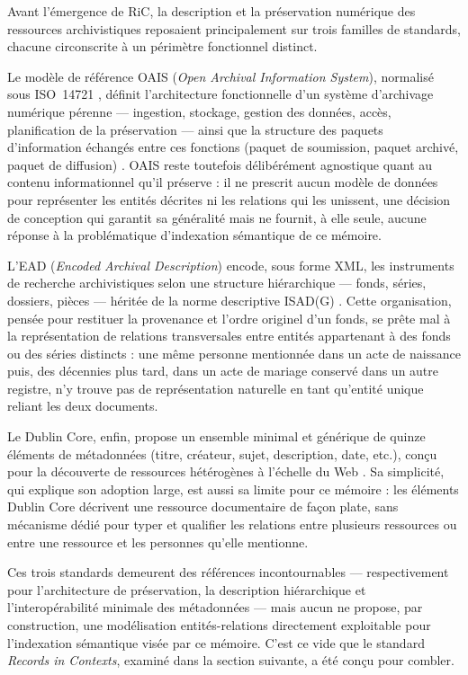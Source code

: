 Avant l'émergence de RiC, la description et la préservation numérique des ressources archivistiques reposaient principalement sur trois familles de standards, chacune circonscrite à un périmètre fonctionnel distinct.

Le modèle de référence OAIS (\textit{Open Archival Information System}),
normalisé sous ISO~14721 \cite{iso2012_14721}, définit l'architecture fonctionnelle d'un système d'archivage numérique pérenne --- ingestion, stockage, gestion des données, accès, planification de la préservation --- ainsi que la structure des paquets d'information échangés entre ces fonctions (paquet de soumission, paquet archivé, paquet de diffusion) \cite{iso2012_14721}.
OAIS reste toutefois délibérément agnostique quant au contenu informationnel qu'il préserve : il ne prescrit aucun modèle de données pour représenter les entités décrites ni les relations qui les unissent, une décision de conception qui garantit sa généralité mais ne fournit, à elle seule, aucune réponse à la problématique d'indexation sémantique de ce mémoire.

L'EAD (\textit{Encoded Archival Description}) encode, sous forme XML, les instruments de recherche archivistiques selon une structure hiérarchique --- fonds, séries, dossiers, pièces --- héritée de la norme descriptive ISAD(G) \cite{saa2019ead3}.
Cette organisation, pensée pour restituer la provenance et l'ordre originel d'un fonds, se prête mal à la représentation de relations transversales entre entités appartenant à des fonds ou des séries distincts : une même personne mentionnée dans un acte de naissance puis, des décennies plus tard, dans un acte de mariage conservé dans un autre registre, n'y trouve pas de représentation naturelle en tant qu'entité unique reliant les deux documents.

Le Dublin Core, enfin, propose un ensemble minimal et générique de quinze éléments de métadonnées (titre, créateur, sujet, description, date, etc.), conçu pour la découverte de ressources hétérogènes à l'échelle du Web \cite{dcmi2020terms}.
Sa simplicité, qui explique son adoption large, est aussi sa limite pour ce mémoire : les éléments Dublin Core décrivent une ressource documentaire de façon plate, sans mécanisme dédié pour typer et qualifier les relations entre plusieurs ressources ou entre une ressource et les personnes qu'elle mentionne.

Ces trois standards demeurent des références incontournables --- respectivement pour l'architecture de préservation, la description hiérarchique et l'interopérabilité minimale des métadonnées --- mais aucun ne propose, par construction, une modélisation entités-relations directement exploitable pour l'indexation sémantique visée par ce mémoire. C'est ce vide que le standard \textit{Records in Contexts}, examiné dans la section suivante, a été conçu pour combler.

